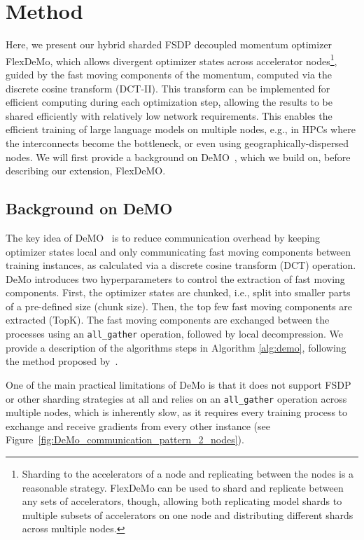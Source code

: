\section{Method}\label{sec:method}
Here, we present our hybrid sharded FSDP decoupled momentum optimizer FlexDeMo, which allows divergent optimizer states across accelerator nodes\footnote{Sharding to the accelerators of a node and replicating between the nodes is a reasonable strategy. FlexDeMo can be used to shard and replicate between any sets of accelerators, though, allowing both replicating model shards to multiple subsets of accelerators on one node and distributing different shards across multiple nodes.}, guided by the fast moving components of the momentum, computed via the discrete cosine transform (DCT-II). This transform can be implemented for efficient computing during each optimization step, allowing the results to be shared efficiently with relatively low network requirements. This enables the efficient training of large language models on multiple nodes, e.g., in HPCs where the interconnects become the bottleneck, or even using geographically-dispersed nodes. We will first provide a background on DeMO~\cite{peng2024demodecoupledmomentumoptimization}, which we build on, before describing our extension, FlexDeMO.

\subsection{Background on DeMO}
The key idea of DeMO~\cite{peng2024demodecoupledmomentumoptimization} is to reduce communication overhead by keeping optimizer states local and only communicating fast moving components between training instances, as calculated via a discrete cosine transform (DCT) operation.
DeMo introduces two hyperparameters to control the extraction of fast moving components. First, the optimizer states are chunked, i.e., split into smaller parts of a pre-defined size (chunk size). Then, the top few  fast moving components are extracted (TopK). The fast moving components are exchanged between the processes using an \texttt{all\_gather} operation, followed by local decompression. We provide a description of the algorithms steps in Algorithm \ref{alg:demo}, following the method proposed by~\cite{peng2024demodecoupledmomentumoptimization}.

One of the main practical limitations of DeMo is that it does not support FSDP or other sharding strategies at all and relies on an \texttt{all\_gather} operation across multiple nodes, which is inherently slow, as it requires every training process to exchange and receive gradients from every other instance (see Figure~\ref{fig:DeMo_communication_pattern_2_nodes}).

